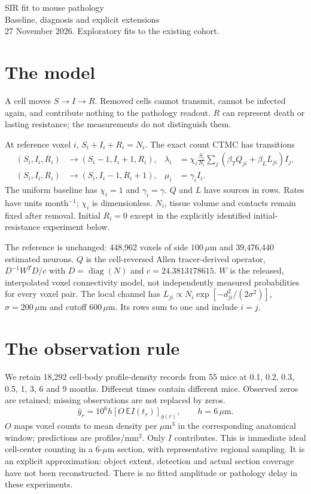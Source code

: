 \documentclass[10pt]{article}
\begin{document}
\begin{center}
{\LARGE SIR fit to mouse pathology}\\[5pt]
{\large Baseline, diagnosis and explicit extensions}\\[4pt]
\small 27 November 2026. Exploratory fits to the existing cohort.
\end{center}

\section*{The model}
A cell moves $S\to I\to R$. Removed cells cannot transmit, cannot be infected again, and contribute nothing to the pathology readout. $R$ can represent death or lasting resistance; the measurements do not distinguish them.

At reference voxel $i$, $S_i+I_i+R_i=N_i$. The exact count CTMC has transitions
\begin{align*}
(S_i,I_i,R_i)&\longrightarrow(S_i-1,I_i+1,R_i), &
\lambda_i&=\chi_i\frac{S_i}{N_i}\sum_j(\beta_TQ_{ji}+\beta_LL_{ji})I_j,\\
(S_i,I_i,R_i)&\longrightarrow(S_i,I_i-1,R_i+1), &
\mu_i&=\gamma_i I_i.
\end{align*}
The uniform baseline has $\chi_i=1$ and $\gamma_i=\gamma$. $Q$ and $L$ have sources in rows. Rates have units month$^{-1}$; $\chi_i$ is dimensionless. $N_i$, tissue volume and contacts remain fixed after removal. Initial $R_i=0$ except in the explicitly identified initial-resistance experiment below.

The reference is unchanged: 448,962 voxels of side $100\,\mu$m and 39,476,440 estimated neurons. $Q$ is the cell-reversed Allen tracer-derived operator, $D^{-1}W^TD/c$ with $D=\operatorname{diag}(N)$ and $c=24.3813178615$. $W$ is the released, interpolated voxel connectivity model, not independently measured probabilities for every voxel pair. The local channel has $L_{ji}\propto N_i\exp[-d_{ji}^2/(2\sigma^2)]$, $\sigma=200\,\mu$m and cutoff $600\,\mu$m. Its rows sum to one and include $i=j$.

\section*{The observation rule}
We retain 18,292 cell-body profile-density records from 55 mice at 0.1, 0.2, 0.3, 0.5, 1, 3, 6 and 9 months. Different times contain different mice. Observed zeros are retained; missing observations are not replaced by zeros.
\[
\widehat y_r=10^6 h[O\,\mathbb E I(t_r)]_{g(r)},\qquad h=6\,\mu\mathrm m.
\]
$O$ maps voxel counts to mean density per $\mu$m$^3$ in the corresponding anatomical window; predictions are profiles/mm$^2$. Only $I$ contributes. This is immediate ideal cell-center counting in a 6-$\mu$m section, with representative regional sampling. It is an explicit approximation: object extent, detection and actual section coverage have not been reconstructed. There is no fitted amplitude or pathology delay in these experiments.
\end{document}
